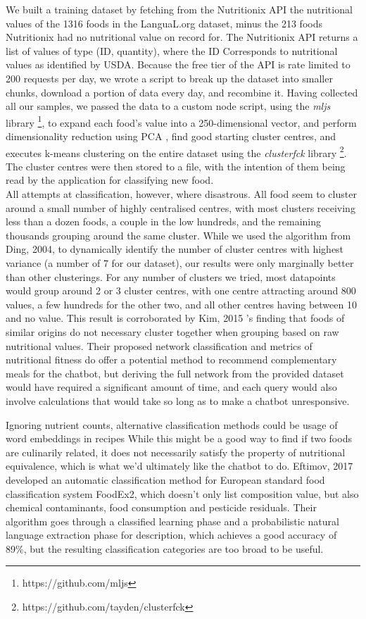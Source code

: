 We built a training dataset by fetching from the Nutritionix API the nutritional values of the 1316 foods in the LanguaL.org dataset, minus the 213 foods Nutritionix had no nutritional value on record for. The Nutritionix API returns a list of values of type (ID, quantity), where the ID Corresponds to nutritional values as identified by USDA. Because the free tier of the API is rate limited to 200 requests per day, we wrote a script to break up the dataset into smaller chunks, download a portion of data every day, and recombine it. Having collected all our samples, we passed the data to a custom node script, using the \textit{mljs} library \footnote{https://github.com/mljs}, to expand each food's value into a 250-dimensional vector, and perform dimensionality reduction using PCA \cite{Ding2004}, find good starting cluster centres, and executes k-means clustering on the entire dataset using the \textit{clusterfck} library \footnote{https://github.com/tayden/clusterfck}. The cluster centres were then stored to a file, with the intention of them being read by the application for classifying new food. \\
All attempts at classification, however, where disastrous. All food seem to cluster around a small number of highly centralised centres, with most clusters receiving less than a dozen foods, a couple in the low hundreds, and the remaining thousands grouping around the same cluster. While we used the algorithm from Ding, 2004, to dynamically identify the number of cluster centres with highest variance (a number of 7 for our dataset), our results were only marginally better than other clusterings. For any number of clusters we tried, most datapoints would group around 2 or 3 cluster centres, with one centre attracting around 800 values, a few hundreds for the other two, and all other centres having between 10 and no value. This result is corroborated by Kim, 2015 \cite{Kim2015a}'s finding that foods of similar origins do not necessary cluster together when grouping based on raw nutritional values. Their proposed network classification and metrics of nutritional fitness do offer a potential method to recommend complementary meals for the chatbot, but deriving the full network from the provided dataset would have required a significant amount of time, and each query would also involve calculations that would take so long as to make a chatbot unresponsive.

Ignoring nutrient counts, alternative classification methods could be usage of word embeddings in recipes \cite{food2vec} While this might be a good way to find if two foods are culinarily related, it does not necessarily satisfy the property of nutritional equivalence, which is what we'd ultimately like the chatbot to do.
Eftimov, 2017 \cite{Eftimov2017} developed an automatic classification method for European standard food classification system FoodEx2, which doesn't only list composition value, but also chemical contaminants, food consumption and pesticide residuals. Their algorithm goes through a classified learning phase and a probabilistic natural language extraction phase for description, which achieves a good accuracy of 89\%, but the resulting classification categories are too broad to be useful.


